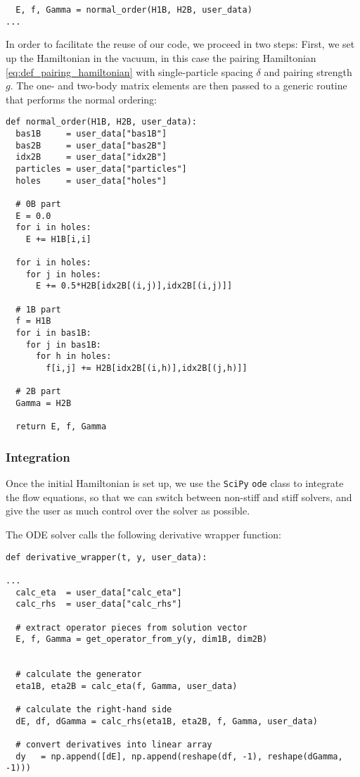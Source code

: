 {\begin{lstlisting}
  E, f, Gamma = normal_order(H1B, H2B, user_data) 
...
\end{lstlisting}
In order to facilitate the reuse of our code, we proceed in two
steps: First, we set up the Hamiltonian in the vacuum, in this case the
pairing Hamiltonian \eqref{eq:def_pairing_hamiltonian} with single-particle
spacing $\delta$ and pairing strength $g$. The one- and two-body matrix
elements are then passed to a generic routine that performs the normal ordering:
\begin{lstlisting}
def normal_order(H1B, H2B, user_data):
  bas1B     = user_data["bas1B"]
  bas2B     = user_data["bas2B"]
  idx2B     = user_data["idx2B"]
  particles = user_data["particles"]
  holes     = user_data["holes"]

  # 0B part
  E = 0.0
  for i in holes:
    E += H1B[i,i]

  for i in holes:
    for j in holes:
      E += 0.5*H2B[idx2B[(i,j)],idx2B[(i,j)]]  

  # 1B part
  f = H1B
  for i in bas1B:
    for j in bas1B:
      for h in holes:
        f[i,j] += H2B[idx2B[(i,h)],idx2B[(j,h)]]  

  # 2B part
  Gamma = H2B

  return E, f, Gamma
\end{lstlisting}

\subsubsection*{Integration}
Once the initial Hamiltonian is set up, we use the \texttt{SciPy}
\texttt{ode} class to integrate the flow equations, so that we can
switch between non-stiff and stiff solvers, and give the user as 
much control over the solver as possible.

The ODE solver calls the following derivative wrapper function:
\begin{lstlisting}
def derivative_wrapper(t, y, user_data):

...
  calc_eta  = user_data["calc_eta"]
  calc_rhs  = user_data["calc_rhs"]

  # extract operator pieces from solution vector
  E, f, Gamma = get_operator_from_y(y, dim1B, dim2B)


  # calculate the generator
  eta1B, eta2B = calc_eta(f, Gamma, user_data)

  # calculate the right-hand side
  dE, df, dGamma = calc_rhs(eta1B, eta2B, f, Gamma, user_data)

  # convert derivatives into linear array
  dy   = np.append([dE], np.append(reshape(df, -1), reshape(dGamma, -1)))


\end{lstlisting}}
